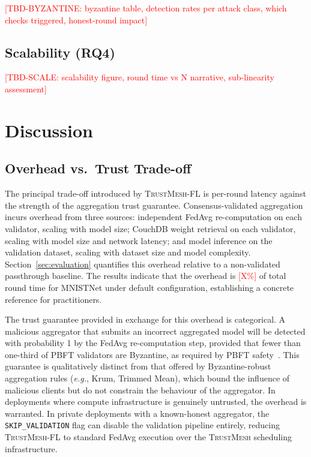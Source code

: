 \documentclass[lettersize,journal]{IEEEtran}
\newcommand{\tmfl}{\textsc{TrustMesh-FL}}
\newcommand{\tm}{\textsc{TrustMesh}}
\newcommand{\eg}{\textit{e.g.}}
\begin{document}
\textcolor{red}{[TBD-BYZANTINE: byzantine table, detection rates per attack class,
which checks triggered, honest-round impact]}

\subsection{Scalability (RQ4)}
\label{sec:eval-scale}

\textcolor{red}{[TBD-SCALE: scalability figure, round time vs N narrative,
sub-linearity assessment]}

\section{Discussion}
\label{sec:discussion}

\subsection{Overhead vs.\ Trust Trade-off}

The principal trade-off introduced by \tmfl{} is per-round latency against the strength
of the aggregation trust guarantee. Consensus-validated aggregation incurs overhead from
three sources: independent FedAvg re-computation on each validator, scaling with model
size; CouchDB weight retrieval on each validator, scaling with model size and network
latency; and model inference on the validation dataset, scaling with dataset size and
model complexity. Section~\ref{sec:evaluation} quantifies this overhead relative to a
non-validated passthrough baseline. The results indicate that the overhead is
\textcolor{red}{[X\%]} of total round time for MNISTNet under default configuration,
establishing a concrete reference for practitioners.

The trust guarantee provided in exchange for this overhead is categorical. A malicious
aggregator that submits an incorrect aggregated model will be detected with probability
1 by the FedAvg re-computation step, provided that fewer than one-third of PBFT validators
are Byzantine, as required by PBFT safety~\cite{castro1999practical}. This guarantee is
qualitatively distinct from that offered by Byzantine-robust aggregation rules
(\eg, Krum, Trimmed Mean), which bound the influence of malicious clients but do not
constrain the behaviour of the aggregator. In deployments where compute infrastructure is
genuinely untrusted, the overhead is warranted. In private deployments with a known-honest
aggregator, the \texttt{SKIP\_VALIDATION} flag can disable the validation pipeline entirely,
reducing \tmfl{} to standard FedAvg execution over the \tm{} scheduling infrastructure.
\end{document}
